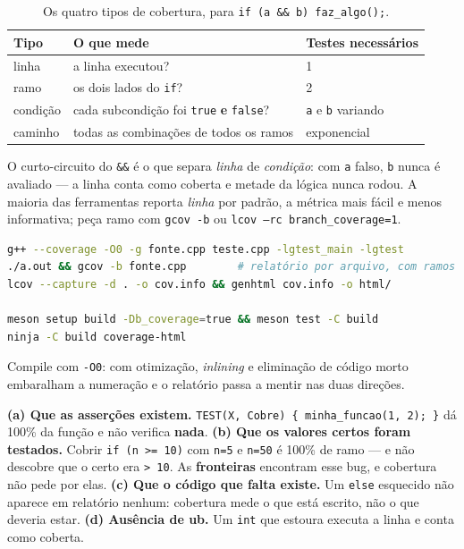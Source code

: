 \begin{table}[htbp]
\centering
\caption{Os quatro tipos de cobertura, para \texttt{if (a \&\& b) faz\_algo();}.}
\label{tab:cobertura-tipos}
\footnotesize
\begin{tabular}{@{}lll@{}}
\toprule
\textbf{Tipo} & \textbf{O que mede} & \textbf{Testes necessários} \\
\midrule
linha    & a linha executou?                      & 1 \\
ramo     & os dois lados do \texttt{if}?          & 2 \\
condição & cada subcondição foi \texttt{true} \textbf{e} \texttt{false}? & \texttt{a} e \texttt{b} variando \\
caminho  & todas as combinações de todos os ramos & exponencial \\
\bottomrule
\end{tabular}
\end{table}

O curto-circuito do \texttt{\&\&} é o que separa \emph{linha} de
\emph{condição}: com \texttt{a} falso, \texttt{b} nunca é avaliado --- a linha
conta como coberta e metade da lógica nunca rodou. A maioria das ferramentas
reporta \emph{linha} por padrão, a métrica mais fácil e menos informativa; peça
ramo com \texttt{gcov -b} ou \texttt{lcov --rc branch\_coverage=1}.

\begin{lstlisting}[style=bt, language=bash,
    caption={Medindo cobertura com GCC e com o Meson.}]
g++ --coverage -O0 -g fonte.cpp teste.cpp -lgtest_main -lgtest
./a.out && gcov -b fonte.cpp        # relatório por arquivo, com ramos
lcov --capture -d . -o cov.info && genhtml cov.info -o html/

meson setup build -Db_coverage=true && meson test -C build
ninja -C build coverage-html
\end{lstlisting}

Compile com \texttt{-O0}: com otimização, \emph{inlining} e eliminação de código
morto embaralham a numeração e o relatório passa a mentir nas duas direções.

\begin{armadilha}
\textbf{(a) Que as asserções existem.} \texttt{TEST(X, Cobre) \{ minha\_funcao(1,
2); \}} dá 100\% da função e não verifica \textbf{nada}.
\textbf{(b) Que os valores certos foram testados.} Cobrir \texttt{if (n >= 10)}
com \texttt{n=5} e \texttt{n=50} é 100\% de ramo --- e não descobre que o certo
era \texttt{> 10}. As \textbf{fronteiras} encontram esse bug, e cobertura não
pede por elas.
\textbf{(c) Que o código que falta existe.} Um \texttt{else} esquecido não
aparece em relatório nenhum: cobertura mede o que está escrito, não o que deveria
estar.
\textbf{(d) Ausência de \gls{ub}.} Um \texttt{int} que estoura executa a linha e
conta como coberta.
\end{armadilha}

